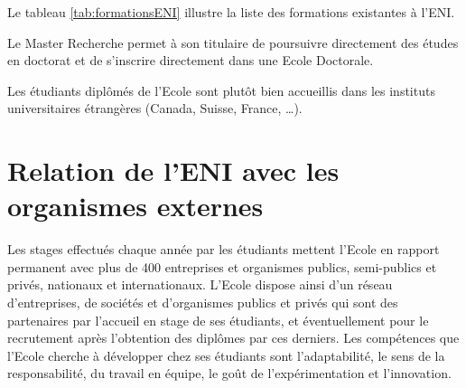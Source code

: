 \documentclass[12pt]{report}
\begin{document}
				Le tableau \ref{tab:formationsENI} illustre la liste des formations existantes à l’ENI.

				\begin{table}[h]
				  \centering
				  \caption{Liste des formations existantes à l’ENI}
				  \label{tab:formationsENI}
				\end{table}
				\FloatBarrier				

				Le Master Recherche permet à son titulaire de poursuivre directement des études en doctorat et de s’inscrire directement dans une Ecole Doctorale.

				Les étudiants diplômés de l’Ecole sont plutôt bien accueillis dans les instituts universitaires étrangères (Canada, Suisse, France, …).

				\section{Relation de l’ENI avec les organismes externes}
				
				\hspace{15pt} Les stages effectués chaque année par les étudiants mettent l’Ecole en rapport permanent avec plus de 400 entreprises et organismes publics, semi-publics et privés, nationaux et internationaux. L’Ecole dispose ainsi d’un réseau d’entreprises, de sociétés et d’organismes publics et privés qui sont des partenaires par l’accueil en stage de ses étudiants, et éventuellement pour le recrutement après l’obtention des diplômes par ces derniers. Les compétences que l’Ecole cherche à développer chez ses étudiants sont l’adaptabilité, le sens de la responsabilité, du travail en équipe, le goût de l’expérimentation et l’innovation.
\end{document}
